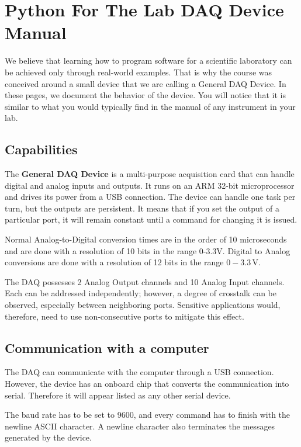 \chapter{Python For The Lab {DAQ} Device Manual}\label{ch:pftl-daq-manual}
We believe that learning how to program software for a scientific laboratory can be achieved only through real-world examples. That is why the course was conceived around a small device that we are calling a General {DAQ} Device. In these pages, we document the behavior of the device. You will notice that it is similar to what you would typically find in the manual of any instrument in your lab.

\section{Capabilities}\label{sec:capabilities}
The \textbf{General {DAQ} Device} is a multi-purpose acquisition card that can handle digital and analog inputs and outputs. It runs on an {ARM} 32-bit microprocessor and drives its power from a {USB} connection. The device can handle one task per turn, but the outputs are persistent. It means that if you set the output of a particular port, it will remain constant until a command for changing it is issued.

Normal Analog-to-Digital conversion times are in the order of 10 microseconds and are done with a resolution of 10 bits in the range 0-3.3V. Digital to Analog conversions are done with a resolution of 12 bits in the range $0-3.3\,\textrm{V}$.

The {DAQ} possesses 2 Analog Output channels and 10 Analog Input channels. Each can be addressed independently; however, a degree of crosstalk can be observed, especially between neighboring ports. Sensitive applications would, therefore, need to use non-consecutive ports to mitigate this effect.

\section{Communication with a computer}\label{sec:communication-with-acomputer}
The {DAQ} can communicate with the computer through a {USB} connection. However, the device has an onboard chip that converts the communication into serial. Therefore it will appear listed as any other serial device.

The baud rate has to be set to 9600, and every command has to finish with the newline {ASCII} character. A newline character also terminates the messages generated by the device.


